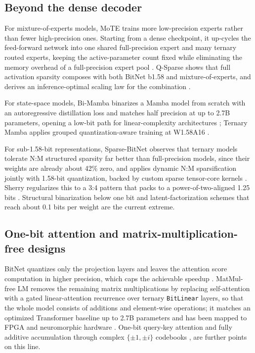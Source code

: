 \documentclass[11pt]{article}
\begin{document}
\subsection{Beyond the dense decoder}

For mixture-of-experts models, MoTE trains more low-precision experts rather than fewer
high-precision ones. Starting from a dense checkpoint, it up-cycles the feed-forward
network into one shared full-precision expert and many ternary routed experts, keeping
the active-parameter count fixed while eliminating the memory overhead of a
full-precision expert pool \cite{Wang2025-MoTE}. Q-Sparse shows that full activation sparsity
composes with both BitNet b1.58 and mixture-of-experts, and derives an inference-optimal
scaling law for the combination \cite{Wang2024-QSparse}.

For state-space models, Bi-Mamba binarizes a Mamba model from scratch with an
autoregressive distillation loss and matches half precision at up to 2.7B parameters,
opening a low-bit path for linear-complexity architectures \cite{Tang2024-BiMamba}; Ternary
Mamba applies grouped quantization-aware training at W1.58A16
\cite{Ganesaraja2026-TernaryMamba}.

For sub-1.58-bit representations, Sparse-BitNet observes that ternary models tolerate
N:M structured sparsity far better than full-precision models, since their weights are
already about 42\% zero, and applies dynamic N:M sparsification jointly with 1.58-bit
quantization, backed by custom sparse tensor-core kernels \cite{Zhang2026-SparseBitNet}.
Sherry regularizes this to a 3:4 pattern that packs to a power-of-two-aligned 1.25 bits
\cite{Huang2026-Sherry}. Structural binarization below one bit \cite{Dong2024-STBLLM} and
latent-factorization schemes that reach about 0.1 bits per weight \cite{Lee2025-LittleBit}
are the current extreme.

\subsection{One-bit attention and matrix-multiplication-free designs}

BitNet quantizes only the projection layers and leaves the attention score computation
in higher precision, which caps the achievable speedup \cite{Malekar2024-MatmulOrNot}.
MatMul-free LM removes the remaining matrix multiplications by replacing self-attention
with a gated linear-attention recurrence over ternary \texttt{BitLinear} layers, so that the
whole model consists of additions and element-wise operations; it matches an optimized
Transformer baseline up to 2.7B parameters and has been mapped to FPGA and neuromorphic
hardware \cite{Zhu2024-MatmulFree}. One-bit query-key attention and fully additive
accumulation through complex $\{\pm 1, \pm i\}$ codebooks \cite{Wang2025-iFairy},
\cite{Wang2025-Fairy2i} are further points on this line.
\end{document}
